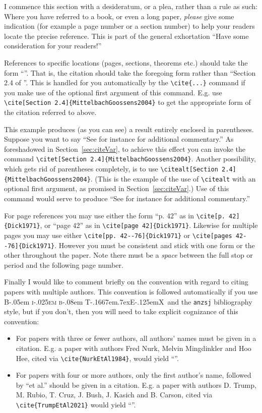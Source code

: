 \documentclass[times, doublespace]{anzsauth}
\newcommand\BibTeX{{\rmfamily B\kern-.05em \textsc{i\kern-.025em b}\kern-.08em
T\kern-.1667em\lower.7ex\hbox{E}\kern-.125emX}}
\begin{document}
I commence this section with a desideratum, or a plea, rather
than a rule as such: Where you have referred to a book, or even
a long paper, \emph{please} give some indication (for example a
page number or a section number) to help your readers locate the
precise reference.  This is part of the general exhortation ``Have
some consideration for your readers!''

References to specific locations (pages, sections, theorems etc.)
should take the form ``\cite[Section 2.4]{MittelbachGoossens2004}''.
That is, the citation should take the foregoing form rather than
``Section 2.4 of \cite{MittelbachGoossens2004}''.  This is
handled for you automatically by the \verb!\cite{...}! command
if you make use of the optional first argument of this command.
E.g. use \verb!\cite[Section 2.4]{MittelbachGoossens2004}! to get
the appropriate form of the citation referred to above.

This example produces (as you can see) a result entirely enclosed
in parentheses.  Suppose you want to say ``See for instance
\citet[Section 2.4]{MittelbachGoossens2004} for additional
commentary.''  As foreshadowed in Section~\ref{sec:citeVar}, to
achieve this effect you can invoke the command
\verb!\citet[Section 2.4]{MittelbachGoossens2004}!.  Another
possibility, which gets rid of parentheses completely, is to use
\verb!\citealt[Section 2.4]{MittelbachGoossens2004}!.  (This is
the example of the use of \verb!\citealt! with an optional first
argument, as promised in Section~\ref{sec:citeVar}.)  Use of this
command would serve to produce ``See for instance \citealt[Section
2.4]{MittelbachGoossens2004} for additional commentary.''

For page references you may use either the form ``p. 42'' as in
\verb!\cite[p. 42]{Dick1971}!, or ``page 42'' as in
\verb!\cite[page 42]{Dick1971}!.  Likewise for multiple pages you may
use either \verb!\cite[pp. 42--76]{Dick1971}!
or \verb!\cite[pages 42--76]{Dick1971}!.
However you must be consistent and stick with one form or the
other throughout the paper.  Note there must be a \emph{space}
between the full stop or period and the following page number.

Finally I would like to comment briefly on the convention with
regard to citing papers with multiple authors.  This convention
is followed automatically if you use \BibTeX\ and the \texttt{anzsj}
bibliography style, but if you don't, then you will
need to take explicit cognizance of this convention:
\begin{itemize}
\item For papers with three or fewer authors, all authors' names
must be given in a citation.  E.g. a paper with authors Fred Nurk,
Melvin Mingdinkler and Hoo Hee, cited via \verb!\cite{NurkEtAl1984}!,
would yield ``\cite{NurkEtAl1984}''.
\item For papers with four or more authors, only the first
author's name, followed by ``et al.'' should be given in a citation.
E.g. a paper with authors D. Trump, M. Rubio, T. Cruz, J. Bush, J. Kasich
and B. Carson, cited via \verb!\cite{TrumpEtAl2021}! 
would yield ``\cite{TrumpEtAl2021}''. 
\end{itemize}
\end{document}
